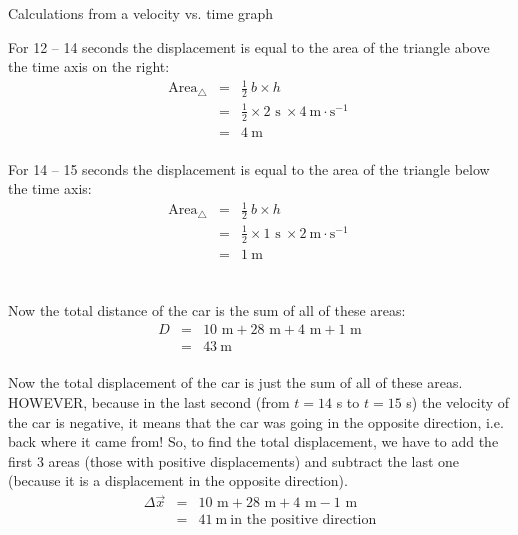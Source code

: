 \begin{wex}{Calculations from a velocity vs. time graph}
{\begin{minipage}{0.4\textwidth}
For 12 -- 14 seconds the displacement is equal to the area of the triangle above the time axis on the right:
\begin{eqnarray*}
\text{Area}_{\triangle} &=& \frac{1}{2}~b \times h\\
&=& \frac{1}{2} \times 2\text{~s}\ \times 4 ~\text{m}\cdot \text{s}^{-1} \ \\
&=&4\ \text{m}\\
\end{eqnarray*}
\end{minipage}
\begin{minipage}{0.05\textwidth}
\begin{center}
\end{center}
\end{minipage}
\begin{minipage}{0.4\textwidth}
For 14 -- 15 seconds the displacement is equal to the area of the triangle below the time axis:
\begin{eqnarray*}
\text{Area}_{\triangle} &=& \frac{1}{2}~b \times h\\
&=& \frac{1}{2} \times 1\text{~s}\ \times 2 ~\text{m}\cdot \text{s}^{-1}\ \\
&=&1\ \text{m}\\
\end{eqnarray*}
\end{minipage}
\\
Now the total distance of the car is the sum of all of these areas:
\begin{eqnarray*}
D&=&10\text{~m} + 28\text{~m} + 4\text{~m} + 1\text{~m}\\
&=&43\ \text{m}
\end{eqnarray*}
\\
Now the total displacement of the car is just the sum of all of these areas. HOWEVER, because in the last second (from $t=14$ s to $t=15$ s) the velocity of the car is negative, it means that the car was going in the opposite direction, i.e. back where it came from! So, to find the total displacement, we have to add the first 3 areas (those with positive displacements) and subtract the last one (because it is a displacement in the opposite direction).
\begin{eqnarray*}
\Delta \vec{x}&=&10\text{~m} +28\text{~m} +4\text{~m} -1\text{~m}\\
&=&41\ \text{m}\ \mbox{in the positive direction}
\end{eqnarray*}}
\end{wex}

